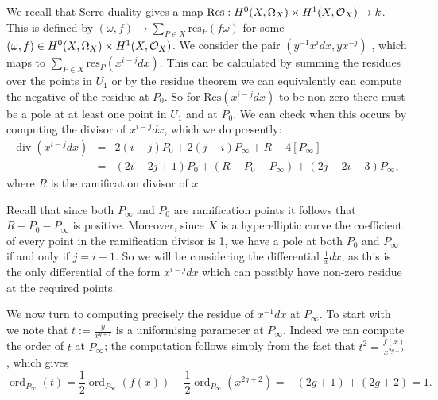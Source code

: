 \documentclass[draft, 11pt]{article} %
\theoremstyle{plain}
\theoremstyle{remark}
\newcommand{\cO}{{\cal O}}
\DeclareMathOperator{\ord}{ord}
\DeclareMathOperator{\di}{div}
\begin{document}
We recall that Serre duality gives a map $\text{Res}: H^0(X,\Omega_X) \times H^1(X,\cO_X) \rightarrow k$.
This is defined by  $(\omega,f) \rightarrow \sum_{P\in X}\text{res}_P(f\omega)$ for some $(\omega, f) \in   H^0(X,\Omega_X) \times H^1(X,\cO_X)$.
We consider the pair $(y^{-1}x^idx,yx^{-j})$ 
, which maps to $\sum_{P\in X} \text{res}_P (x^{i-j}dx)$. 
This can be calculated by summing the residues over the points in $U_1$ or by the residue theorem we can equivalently can compute the negative of the residue at $P_0$.
So for $\text{Res}(x^{i-j}dx)$ to be non-zero there must be a pole at at least one point in $U_1$ and at $P_0$.
We can check when this occurs by computing the divisor of $x^{i-j}dx$, which we do presently:
\begin{eqnarray}
	\di(x^{i-j}dx) & = &  2(i-j)P_0 +  2(j-i)P_\infty + R - 4[P_\infty] \\
	& = & (2i-2j+1)P_0 +(R-P_0-P_\infty) +(2j-2i-3)P_\infty,
\end{eqnarray}
where $R$ is the ramification divisor of $x$.

Recall that since both $P_\infty$ and $P_0$ are ramification points it follows that $R-P_0-P_\infty$ is positive.
Moreover, since $X$ is a hyperelliptic curve the coefficient of every point in the ramification divisor is 1, we have a pole at both $P_0$ and $P_\infty$ if and only if $j=i+1$.
So we will be considering the differential $\frac{1}{x}dx$, as this is the only differential of the form $x^{i-j}dx$ which can possibly have non-zero residue at the required points.


We now turn to computing precisely the residue of $x^{-1}dx$ at $P_\infty$.
To start with we note that $t:= \frac{y}{x^{g+1}}$ is a uniformising parameter at $P_\infty$.
Indeed we can compute the order of $t$ at $P_\infty$; the computation follows simply from the fact that $t^2 = \frac{f(x)}{x^{2g+2}}$, which gives
\[
\ord_{P_\infty}(t) = \frac{1}{2}\ord_{P_\infty}(f(x)) - \frac{1}{2}\ord_{P_\infty}(x^{2g+2}) = -(2g+1) + (2g+2) = 1.
\]
\end{document}

